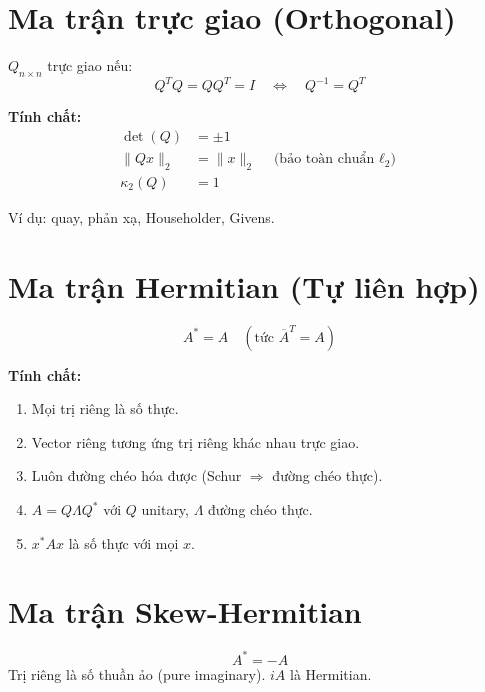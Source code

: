 
\section{Ma trận trực giao (Orthogonal)}

$Q_{n \times n}$ trực giao nếu:
\[
Q^TQ = QQ^T = I \quad \Longleftrightarrow \quad Q^{-1} = Q^T
\]

\textbf{Tính chất:}
\begin{align}
\det(Q) &= \pm 1 \\
\|Qx\|_2 &= \|x\|_2 \quad \text{(bảo toàn chuẩn $\ell_2$)} \\
\kappa_2(Q) &= 1
\end{align}

Ví dụ: quay, phản xạ, Householder, Givens.

\section{Ma trận Hermitian (Tự liên hợp)}

\[
A^* = A \quad (\text{tức } \overline{A}^T = A)
\]

\textbf{Tính chất:}
\begin{enumerate}
    \item Mọi trị riêng là số thực.
    \item Vector riêng tương ứng trị riêng khác nhau trực giao.
    \item Luôn đường chéo hóa được (Schur $\Rightarrow$ đường chéo thực).
    \item $A = Q\Lambda Q^*$ với $Q$ unitary, $\Lambda$ đường chéo thực.
    \item $x^*Ax$ là số thực với mọi $x$.
\end{enumerate}

\section{Ma trận Skew-Hermitian}

\[
A^* = -A
\]
Trị riêng là số thuần ảo (pure imaginary). $iA$ là Hermitian.

